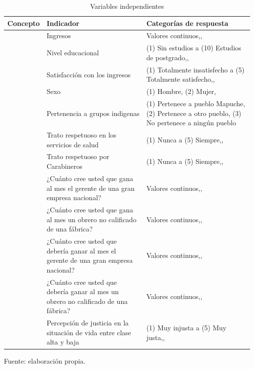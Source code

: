 \documentclass[12pt,twoside]{templates/facsothesis}
\begin{document}
\begin{table}[!h]

\caption{\label{tab:tab-indep}Variables independientes}
\centering
\fontsize{10}{12}\selectfont
\begin{tabu} to 
\toprule
Concepto & Indicador & Categorías de respuesta\\
\midrule
 & Ingresos & Valores continuos,,\\
 & Nivel educacional & (1) Sin estudios a (10) Estudios de postgrado,,\\
 & Satisfacción con los ingresos & (1) Totalmente insatisfecho a (5) Totalmente satisfecho,,\\
 & Sexo & (1) Hombre, (2) Mujer,\\
 & Pertenencia a grupos indigenas & (1) Pertenece a pueblo Mapuche, (2) Pertenece a otro pueblo, (3) No pertenece a ningún pueblo\\
 & Trato respetuoso en los servicios de salud & (1) Nunca a (5) Siempre,,\\
 & Trato respetuoso por Carabineros & (1) Nunca a (5) Siempre,,\\
 & ¿Cuánto cree usted que gana al mes el gerente de una gran empresa nacional? & Valores continuos,,\\
 & ¿Cuánto cree usted que gana al mes un obrero no calificado de una fábrica? & Valores continuos,,\\
 & ¿Cuánto cree usted que debería ganar al mes el gerente de una gran empresa nacional? & Valores continuos,,\\
 & ¿Cuánto cree usted que debería ganar al mes un obrero no calificado de una fábrica? & Valores continuos,,\\
 & Percepción de justicia en la situación de vida entre clase alta y baja & (1) Muy injusta a (5) Muy justa,,\\
\bottomrule
\end{tabu}
\end{table}

\begin{center}
Fuente: elaboración propia.
\end{center}
\end{document}
